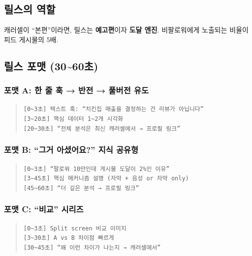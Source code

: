 \documentclass[11pt, a4paper]{article}
\begin{document}
\subsection{릴스의 역할}

캐러셀이 ``본편''이라면, 릴스는 \textbf{예고편}이자 \textbf{도달 엔진}. 비팔로워에게 노출되는 비율이 피드 게시물의 5배.

\subsection{릴스 포맷 (30\textasciitilde 60초)}

\subsubsection{포맷 A: 한 줄 훅 → 반전 → 풀버전 유도}

\begin{quote}
\texttt{[0\textasciitilde 3초]  텍스트 훅: ``치킨집 매출을 결정하는 건 리뷰가 아닙니다''} \\
\texttt{[3\textasciitilde 20초] 핵심 데이터 1\textasciitilde 2개 시각화} \\
\texttt{[20\textasciitilde 30초] ``전체 분석은 최신 캐러셀에서 → 프로필 링크''}
\end{quote}

\subsubsection{포맷 B: ``그거 아셨어요?'' 지식 공유형}

\begin{quote}
\texttt{[0\textasciitilde 3초]  ``팔로워 10만인데 게시물 도달이 2\%인 이유''} \\
\texttt{[3\textasciitilde 45초] 핵심 메커니즘 설명 (자막 + 음성 or 자막 only)} \\
\texttt{[45\textasciitilde 60초] ``더 깊은 분석 → 프로필 링크''}
\end{quote}

\subsubsection{포맷 C: ``비교'' 시리즈}

\begin{quote}
\texttt{[0\textasciitilde 3초]  Split screen 비교 이미지} \\
\texttt{[3\textasciitilde 30초] A vs B 차이점 빠르게} \\
\texttt{[30\textasciitilde 45초] ``왜 이런 차이가 나는지 → 캐러셀에서''}
\end{quote}
\end{document}
